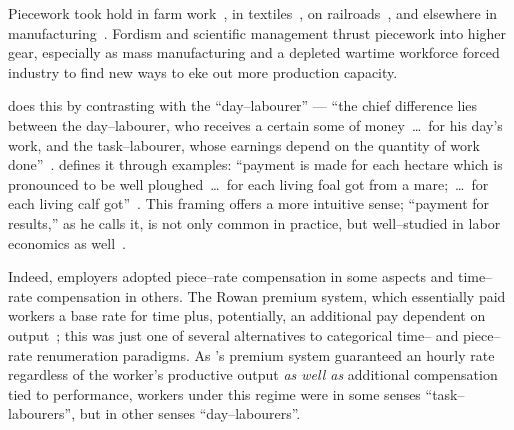 \documentclass[trackingWork]{subfiles}
\begin{document}
Piecework took hold in farm work~\cite{hughRaynbirdTaskWork},
in textiles~\cite{restructuringPieceworkBaker,riisOtherSideLives},
on railroads~\cite{Brown01041990}, and 
elsewhere in manufacturing~\cite{10.2307/3827491}.
Fordism and scientific management thrust piecework into higher gear, especially as
mass manufacturing and
a depleted wartime workforce forced industry to find new ways to eke out more production capacity.


\citeauthor{hughRaynbirdTaskWork} does this by contrasting with the ``day--labourer'' ---
``the chief difference lies between the day--labourer,
who receives a certain some of money~\dots~for his day's work,
and the task--labourer, whose earnings depend on the quantity of work done''~\cite{hughRaynbirdTaskWork}.
\citeauthor{10.2307/2338394} defines it through examples:
``payment is made for each hectare which is pronounced to be well ploughed~\dots~for each living foal got from a mare;~\dots~for each living calf got''~\cite{10.2307/2338394}.
This framing offers a more intuitive sense;
``payment for results,'' as he calls it,
is not only common in practice, but
well--studied in labor economics as well~\cite{Figlio2007901,weitzman1976new,10.2307/3003414,BJIR:BJIR038}.

Indeed, employers adopted piece--rate compensation in some aspects and
time--rate compensation in others.
The Rowan premium system,
which essentially paid workers
a base rate for time plus, potentially,
an additional pay dependent on output~\cite{rowan1901premium};
this was just one of several alternatives to categorical time-- and piece--rate renumeration paradigms.
As \citeauthor{rowan1901premium}'s premium system guaranteed an hourly rate
regardless of the worker's productive output
\textit{as well as} additional compensation tied to performance,
workers under this regime were
in some senses ``task--labourers'', but
in other senses ``day--labourers''.
\end{document}
